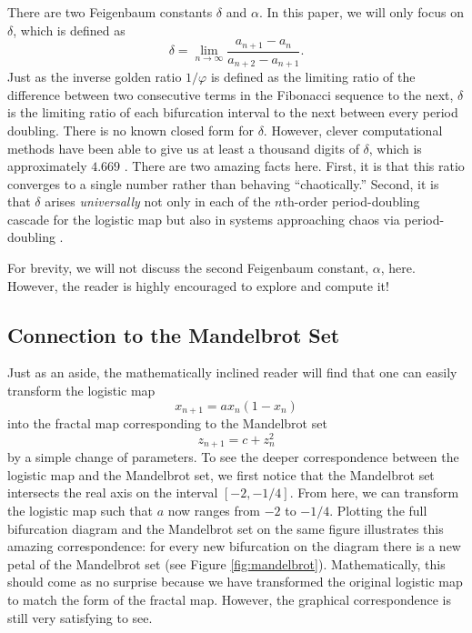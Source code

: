 \documentclass[twocolumn,amsmath,amssymb,aps]{revtex4}
\begin{document}
There are two Feigenbaum constants $\delta$ and $\alpha$. In this paper, we will only focus on $\delta$, which is defined as 
\begin{equation}
\delta = \lim_{n\to \infty} \frac{a_{n+1} -a_n}{a_{n+2} - a_{n+1}} \nonumber.
\end{equation}
Just as the inverse golden ratio $1/\varphi$ is defined as the limiting ratio of the difference between two consecutive terms in the Fibonacci sequence to the next, $\delta$ is the limiting ratio of each bifurcation interval to the next between every period doubling. There is no known closed form for $\delta$. However, clever computational methods have been able to give us at least a thousand digits of $\delta$, which is approximately $4.669$ \cite{feigenbaum_delta}. There are two amazing facts here. First, it is that this ratio converges to a single number rather than behaving ``chaotically.'' Second, it is that $\delta$ arises \textit{universally} not only in each of the $n$th-order period-doubling cascade for the logistic map but also in systems approaching chaos via period-doubling \cite{feigenbaum}. 

For brevity, we will not discuss the second Feigenbaum constant, $\alpha$, here. However, the reader is highly encouraged to explore and compute it!



\subsection{Connection to the Mandelbrot Set}


Just as an aside, the mathematically inclined reader will find that one can easily transform the logistic map 
\begin{equation}
x_{n+1} = ax_n(1-x_n)\nonumber
\end{equation}
into the fractal map corresponding to the Mandelbrot set
\begin{equation}
z_{n+1} = c + z_n^2 \nonumber
\end{equation}
by a simple change of parameters. To see the deeper correspondence between the logistic map and the Mandelbrot set, we first notice that the Mandelbrot set intersects the real axis on the interval $[-2,-1/4]$. From here, we can transform the logistic map such that $a$ now ranges from $-2$ to $-1/4$. Plotting the full bifurcation diagram and the Mandelbrot set on the same figure illustrates this amazing correspondence: for every new bifurcation on the diagram there is a new petal of the Mandelbrot set (see Figure \ref{fig:mandelbrot}). Mathematically, this should come as no surprise because we have transformed the original logistic map to match the form of the fractal map. However, the graphical correspondence is still very satisfying to see.
\end{document}
